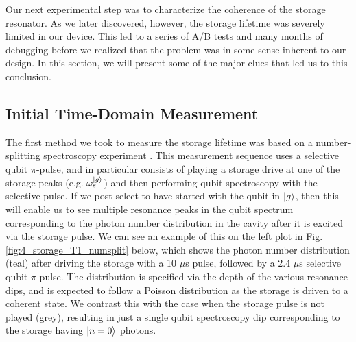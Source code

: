 Our next experimental step was to characterize the coherence of the storage resonator. As we later discovered, however, the storage lifetime was severely limited in our device. This led to a series of A/B tests and many months of debugging before we realized that the problem was in some sense inherent to our design. In this section, we will present some of the major clues that led us to this conclusion. 

\subsection{Initial Time-Domain Measurement}

The first method we took to measure the storage lifetime was based on a number-splitting spectroscopy experiment \cite{schuster2007resolving}. This measurement sequence uses a selective qubit $\pi$-pulse, and in particular consists of playing a storage drive at one of the storage peaks (e.g. $\omega_s^{\lvert g\rangle}$) and then performing qubit spectroscopy with the selective pulse. If we post-select to have started with the qubit in $\lvert g\rangle$, then this will enable us to see multiple resonance peaks in the qubit spectrum corresponding to the photon number distribution in the cavity after it is excited via the storage pulse. We can see an example of this on the left plot in Fig. \ref{fig:4_storage_T1_numsplit} below, which shows the photon number distribution (teal) after driving the storage with a 10 $\mu$s pulse, followed by a 2.4 $\mu$s selective qubit $\pi$-pulse. The distribution is specified via the depth of the various resonance dips, and is expected to follow a Poisson distribution as the storage is driven to a coherent state. We contrast this with the case when the storage pulse is not played (grey), resulting in just a single qubit spectroscopy dip corresponding to the storage having $\lvert n=0\rangle$ photons. 

